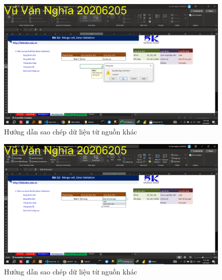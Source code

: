 \documentclass{article}
\begin{document}
    
\begin{figure}[H]
    \centering
    \includegraphics[scale = 0.15]{Video6/HuongDan/3.png}
    \caption{Hướng dẫn sao chép dữ liệu từ nguồn khác}
    \end{figure}


    
\begin{figure}[H]
    \centering
    \includegraphics[scale = 0.15]{Video6/HuongDan/4.png}
    \caption{Hướng dẫn sao chép dữ liệu từ nguồn khác}
    \end{figure}

 
\end{document}
